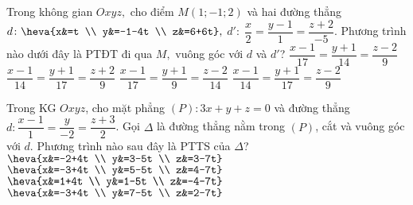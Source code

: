 \begin{ex}%
	Trong không gian $Oxyz,$ cho điểm $M\left(1;-1;2\right)$ và hai đường thẳng $d \colon \heva{x&=t \\ y&=-1-4t \\ z&=6+6t} ,$ $d' \colon \; \dfrac{x}{2} =\dfrac{y-1}{1} =\dfrac{z+2}{-5}$. Phương trình nào dưới đây là PTĐT đi qua $M,$ vuông góc với $d$ và $d'$? 
	\choice 
	{$\dfrac{x-1}{17} =\dfrac{y+1}{14} =\dfrac{z-2}{9} $}
	{$\dfrac{x-1}{14} =\dfrac{y+1}{17} =\dfrac{z+2}{9} $}
	{$\dfrac{x-1}{17} =\dfrac{y+1}{9} =\dfrac{z-2}{14} $}
	{\True $\dfrac{x-1}{14} =\dfrac{y+1}{17} =\dfrac{z-2}{9} $} 
\end{ex} 
\begin{ex}%
	Trong KG $Oxyz$, cho mặt phẳng $\left(P\right) \colon 3x+y+z=0$ và đường thẳng $d \colon \dfrac{x-1}{1} =\dfrac{y}{-2} =\dfrac{z+3}{2} $. Gọi $\Delta $ là đường thẳng nằm trong $\left(P\right)$, cắt và vuông góc với $d$. Phương trình nào sau đây là PTTS của $\Delta $? 
	\choice 
	{$\heva{x&=-2+4t \\ y&=3-5t \\ z&=3-7t} $}
	{\True $\heva{x&=-3+4t \\ y&=5-5t \\ z&=4-7t} $}
	{$\heva{x&=1+4t \\ y&=1-5t \\ z&=-4-7t} $}
	{$\heva{x&=-3+4t \\ y&=7-5t \\ z&=2-7t} $}
\end{ex} 
